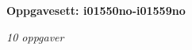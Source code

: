 \centerline{\bf Oppgavesett: i01550no-i01559no}
\vskip 10pt
\centerline{\it 10 oppgaver}\vskip 10pt
\vskip 10pt
